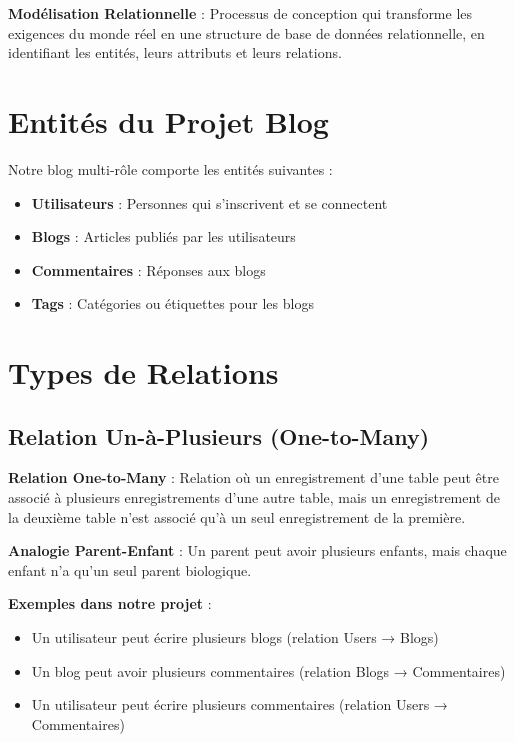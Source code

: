\begin{definitionbox}
    \textbf{Modélisation Relationnelle} : Processus de conception qui transforme les exigences du monde réel en une structure de base de données relationnelle, en identifiant les entités, leurs attributs et leurs relations.
\end{definitionbox}

\section{Entités du Projet Blog}

Notre blog multi-rôle comporte les entités suivantes :

\begin{itemize}
    \item \textbf{Utilisateurs} : Personnes qui s'inscrivent et se connectent
    \item \textbf{Blogs} : Articles publiés par les utilisateurs
    \item \textbf{Commentaires} : Réponses aux blogs
    \item \textbf{Tags} : Catégories ou étiquettes pour les blogs
\end{itemize}

\section{Types de Relations}

\subsection{Relation Un-à-Plusieurs (One-to-Many)}

\begin{definitionbox}
    \textbf{Relation One-to-Many} : Relation où un enregistrement d'une table peut être associé à plusieurs enregistrements d'une autre table, mais un enregistrement de la deuxième table n'est associé qu'à un seul enregistrement de la première.
\end{definitionbox}

\begin{analogybox}
    \textbf{Analogie Parent-Enfant} : Un parent peut avoir plusieurs enfants, mais chaque enfant n'a qu'un seul parent biologique.
\end{analogybox}

\textbf{Exemples dans notre projet} :
\begin{itemize}
    \item Un utilisateur peut écrire plusieurs blogs (relation Users → Blogs)
    \item Un blog peut avoir plusieurs commentaires (relation Blogs → Commentaires)
    \item Un utilisateur peut écrire plusieurs commentaires (relation Users → Commentaires)
\end{itemize}

